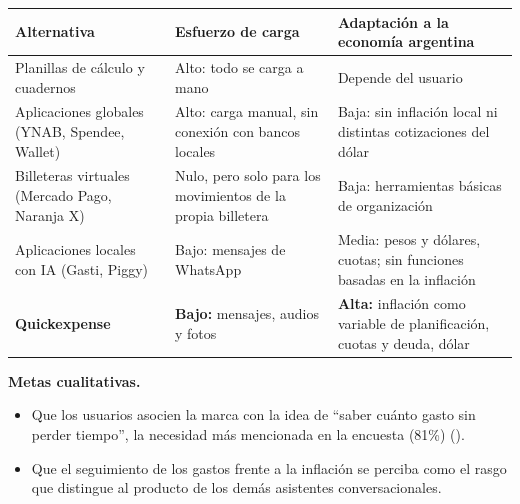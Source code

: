 {\def\LTcaptype{none} %
\begin{longtable}[]{@{}
  >{\raggedright\arraybackslash}p{}
  >{\raggedright\arraybackslash}p{}
  >{\raggedright\arraybackslash}p{}@{}}
\toprule\noalign{}
\begin{minipage}[b]{\linewidth}\raggedright
Alternativa
\end{minipage} & \begin{minipage}[b]{\linewidth}\raggedright
Esfuerzo de carga
\end{minipage} & \begin{minipage}[b]{\linewidth}\raggedright
Adaptación a la economía argentina
\end{minipage} \\
\midrule\noalign{}
\endhead
\bottomrule\noalign{}
\endlastfoot
Planillas de cálculo y cuadernos & Alto: todo se carga a mano & Depende
del usuario \\
Aplicaciones globales (YNAB, Spendee, Wallet) & Alto: carga manual, sin
conexión con bancos locales & Baja: sin inflación local ni distintas
cotizaciones del dólar \\
Billeteras virtuales (Mercado Pago, Naranja X) & Nulo, pero solo para
los movimientos de la propia billetera & Baja: herramientas básicas de
organización \\
Aplicaciones locales con IA (Gasti, Piggy) & Bajo: mensajes de WhatsApp
& Media: pesos y dólares, cuotas; sin funciones basadas en la
inflación \\
\textbf{Quickexpense} & \textbf{Bajo:} mensajes, audios y fotos &
\textbf{Alta:} inflación como variable de planificación, cuotas y deuda,
dólar \\
\end{longtable}
}

\textbf{Metas cualitativas.}

\begin{itemize}
\tightlist
\item
  Que los usuarios asocien la marca con la idea de ``saber cuánto gasto
  sin perder tiempo'', la necesidad más mencionada en la encuesta (81\%)
  ().
\item
  Que el seguimiento de los gastos frente a la inflación se perciba como
  el rasgo que distingue al producto de los demás asistentes
  conversacionales.
\end{itemize}

